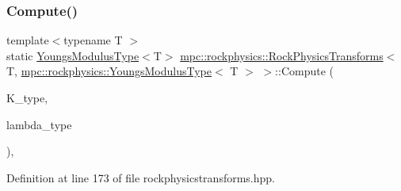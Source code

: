 \subsubsection{\texorpdfstring{Compute()}{Compute()}\hspace{0.1cm}{\footnotesize\ttfamily [2/6]}}
{\footnotesize\ttfamily template$<$typename T $>$ \\
static \mbox{\hyperlink{structmpc_1_1rockphysics_1_1_youngs_modulus_type}{Youngs\+Modulus\+Type}}$<$T$>$ \mbox{\hyperlink{structmpc_1_1rockphysics_1_1_rock_physics_transforms}{mpc\+::rockphysics\+::\+Rock\+Physics\+Transforms}}$<$ T, \mbox{\hyperlink{structmpc_1_1rockphysics_1_1_youngs_modulus_type}{mpc\+::rockphysics\+::\+Youngs\+Modulus\+Type}}$<$ T $>$ $>$\+::Compute (\begin{DoxyParamCaption}\item[{const \mbox{\hyperlink{structmpc_1_1rockphysics_1_1_bulk_modulus_type}{mpc\+::rockphysics\+::\+Bulk\+Modulus\+Type}}$<$ T $>$ \&}]{K\+\_\+type,  }\item[{const \mbox{\hyperlink{structmpc_1_1rockphysics_1_1_lame_paramter_modulus_type}{mpc\+::rockphysics\+::\+Lame\+Paramter\+Modulus\+Type}}$<$ T $>$ \&}]{lambda\+\_\+type }\end{DoxyParamCaption})\hspace{0.3cm}{\ttfamily [inline]}, {\ttfamily [static]}}



Definition at line 173 of file rockphysicstransforms.\+hpp.

\mbox{\label{structmpc_1_1rockphysics_1_1_rock_physics_transforms_3_01_t_00_01mpc_1_1rockphysics_1_1_youngs_modulus_type_3_01_t_01_4_01_4_a174c797249b791733dbdf85437f31bc4}} 
